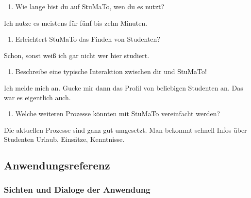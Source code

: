 \documentclass[
  12pt,
  ngerman,
  a4paper,
]{article}
\providecommand{\tightlist}{%
  \setlength{\itemsep}{0pt}\setlength{\parskip}{0pt}}
\begin{document}
\begin{enumerate}
\def\labelenumi{\arabic{enumi}.}
\setcounter{enumi}{12}
\tightlist
\item
  Wie lange bist du auf StuMaTo, wen du es nutzt?
\end{enumerate}

Ich nutze es meistens für fünf bis zehn Minuten.

\begin{enumerate}
\def\labelenumi{\arabic{enumi}.}
\setcounter{enumi}{13}
\tightlist
\item
  Erleichtert StuMaTo das Finden von Studenten?
\end{enumerate}

Schon, sonst weiß ich gar nicht wer hier studiert.

\begin{enumerate}
\def\labelenumi{\arabic{enumi}.}
\setcounter{enumi}{14}
\tightlist
\item
  Beschreibe eine typische Interaktion zwischen dir und StuMaTo!
\end{enumerate}

Ich melde mich an. Gucke mir dann das Profil von beliebigen Studenten
an. Das war es eigentlich auch.

\begin{enumerate}
\def\labelenumi{\arabic{enumi}.}
\setcounter{enumi}{15}
\tightlist
\item
  Welche weiteren Prozesse könnten mit StuMaTo vereinfacht werden?
\end{enumerate}

Die aktuellen Prozesse sind ganz gut umgesetzt. Man bekommt schnell
Infos über Studenten Urlaub, Einsätze, Kenntnisse.

\hypertarget{sec:appendix:screens}{%
\subsection{Anwendungsreferenz}\label{sec:appendix:screens}}

\hypertarget{sichten-und-dialoge-der-anwendung}{%
\subsubsection{Sichten und Dialoge der
Anwendung}\label{sichten-und-dialoge-der-anwendung}}
\end{document}
